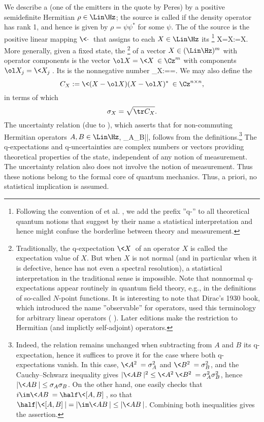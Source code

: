 \documentclass[12pt]{article}
\begin{document}
We describe a  (one of the emitters in the quote by Peres)
by a positive semidefinite Hermitian
 $\rho\in \Lin \Hz$; the source is called
 if the density operator has rank 1, and hence is given by
$\rho=\psi\psi^*$ for some  $\psi$. The  of
the source is the positive linear mapping $\<\cdot\>$ that assigns to
each $X\in \Lin \Hz$ its \footnote{
Following the convention of  et al. \cite{AllBN2},
we add the prefix ''q-'' to all theoretical quantum notions that
suggest by their name a statistical interpretation and hence might
confuse the borderline between theory and measurement.
} %
\ol X=\<X\>:=\Tr\rho X.
\eeq
More generally, given a fixed state, the \footnote{
Traditionally, the q-expectation $\<X\>$ of an operator $X$ is called
the expectation value of $X$. But when $X$ is not normal (and in
particular when it is defective, hence has not even a spectral
resolution), a statistical interpretation in the traditional sense is
impossible. Note that nonnormal q-expectations appear routinely in
quantum field theory, e.g., in the definitions of so-called $N$-point
functions.
It is interesting to note that Dirac's 1930 book, which introduced the
name ''observable'' for operators, used this terminology for arbitrary
linear operators ( \cite[p.28]{Dir1}). Later editions make
the restriction to Hermitian (and implictly self-adjoint) operators.
} %
of a vector $X\in(\Lin \Hz)^m$ with operator components is the vector
$\ol X=\<X\>\in\Cz^m$ with components $\ol X_j=\<X_j\>$. Its
 is the nonnegative number
\sigma_X:==.
\eeq
We may also define the 
\[
C_X:=\<(X-\ol X)(X-\ol X)^*\>\in\Cz^{n\times n},
\]
in terms of which
\[
\sigma_X=\sqrt{\tr C_X}.
\]
The uncertainty relation (due to  \cite{Rob29}), which
asserts that for non-commuting Hermitian operators $A,B\in\Lin\Hz$,
\sigma_A\sigma_B\ge \half |\<[A,B]\>|,
\eeq
follows from the definitions.\footnote{
Indeed, the relation remains unchanged when subtracting from $A$ and
$B$ its q-expectation, hence it suffices to prove it for the case
where both q-expectations vanish. In this case, $\<A^2\>=\sigma_A^2$ and
$\<B^2\>=\sigma_B^2$, and the Cauchy--Schwarz inequality gives
$|\<AB\>|^2\le \<A^2\>\<B^2\>=\sigma_A^2\sigma_B^2$, hence
$|\<AB\>|\le\sigma_A\sigma_B$. On the other hand, one easily checks that
$i\im\<AB\>=\half\<[A,B]\>$, so that
$\half |\<[A,B]\>|=|\im\<AB\>|\le |\<AB\>|$. Combining both inequalities
gives the assertion.
} %
The q-expectations and q-uncertainties are complex numbers or vectors
providing theoretical properties of the state, independent of any notion
of measurement. The uncertainty relation also does not involve the
notion of measurement. Thus these notions belong to the formal core of
quantum mechanics. Thus, a priori, no statistical implication is
assumed.
\end{document}
